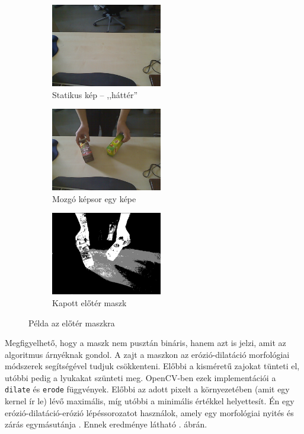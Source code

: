 \begin{figure}[tbh]
\centering
\begin{subfigure}[b]{.32\linewidth}
	\centering
	\includegraphics[width=137pt]{figures/image230.png}
	\caption{Statikus kép -- ,,háttér''}
  \end{subfigure}
\begin{subfigure}[b]{.32\linewidth}
	\centering
	\includegraphics[width=137pt]{figures/image343.png}
	\caption{Mozgó képsor egy képe}
  \end{subfigure}
\begin{subfigure}[b]{.32\linewidth}
	\centering
	\includegraphics[width=137pt]{figures/mask343.png}
	\caption{Kapott előtér maszk}
  \end{subfigure}
\caption{Példa az előtér maszkra \label{fig:my_mog2}}
\end{figure}

Megfigyelhető, hogy a maszk nem pusztán bináris, hanem azt is jelzi, amit az algoritmus árnyéknak gondol. A zajt a maszkon az erózió-dilatáció morfológiai módszerek segítségével tudjuk csökkenteni. Előbbi a kisméretű zajokat tünteti el, utóbbi pedig a lyukakat szünteti meg. OpenCV-ben ezek implementációi a \texttt{dilate} és \texttt{erode} függvények. Előbbi az adott pixelt a környezetében (amit egy kernel ír le) lévő maximális, míg utóbbi a minimális értékkel helyettesít. Én egy erózió-dilatáció-erózió lépéssorozatot használok, amely egy morfológiai nyités és zárás egymásutánja \cite{kepfeldolg-modszerek}. Ennek eredménye látható . ábrán.

